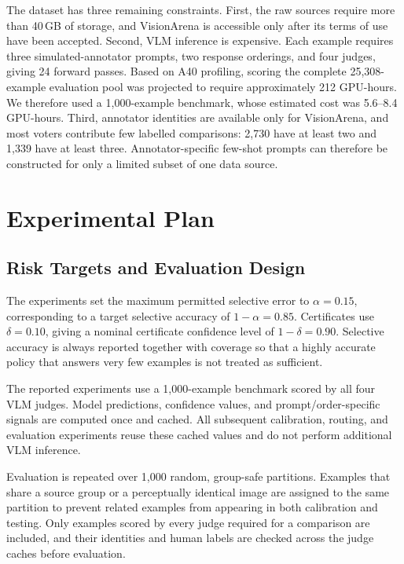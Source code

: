 \documentclass[11pt]{article}
\begin{document}
The dataset has three remaining constraints. First, the raw sources require more than 40\,GB of storage, and VisionArena is accessible only after its terms of use have been accepted. Second, VLM inference is expensive. Each
example requires three simulated-annotator prompts, two response orderings, and four judges, giving 24 forward passes. Based on A40 profiling, scoring the complete 25,308-example evaluation pool was projected to require approximately 212 GPU-hours. We therefore used a 1,000-example benchmark, whose estimated cost was 5.6--8.4 GPU-hours. Third, annotator identities are available only
for VisionArena, and most voters contribute few labelled comparisons: 2,730 have at least two and 1,339 have at least three. Annotator-specific few-shot prompts can therefore be constructed for only a limited subset of one data source.



\section{Experimental Plan}

\subsection{Risk Targets and Evaluation Design}

The experiments set the maximum permitted selective error to
$\alpha=0.15$, corresponding to a target selective accuracy of
$1-\alpha=0.85$. Certificates use $\delta=0.10$, giving a nominal certificate
confidence level of $1-\delta=0.90$. Selective accuracy is always reported
together with coverage so that a highly accurate policy that answers very few
examples is not treated as sufficient.

The reported experiments use a 1,000-example benchmark scored by all four VLM
judges. Model predictions, confidence values, and prompt/order-specific
signals are computed once and cached. All subsequent calibration, routing,
and evaluation experiments reuse these cached values and do not perform
additional VLM inference.

Evaluation is repeated over 1,000 random, group-safe partitions. Examples
that share a source group or a perceptually identical image are assigned to
the same partition to prevent related examples from appearing in both
calibration and testing. Only examples scored by every judge required for a
comparison are included, and their identities and human labels are checked
across the judge caches before evaluation.
\end{document}
